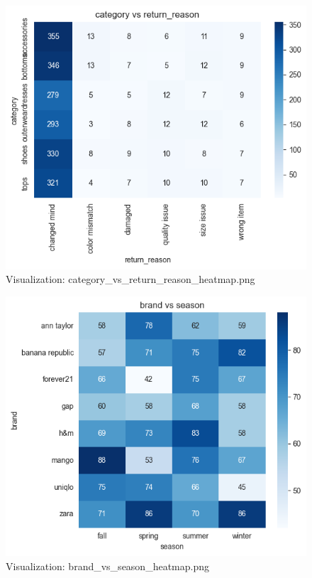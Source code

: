 \documentclass{article}%
\begin{document}
\vspace{10pt}%
\\%
\begin{minipage}[c]{0.48\textwidth}%


\begin{figure}[H]%
\centering%
\includegraphics[width=\linewidth]{output/plots/category_vs_return_reason_heatmap.png}%
\caption{Visualization: category\_vs\_return\_reason\_heatmap.png}%
\end{figure}

%
\end{minipage}%
\begin{minipage}[c]{0.48\textwidth}%


\begin{figure}[H]%
\centering%
\includegraphics[width=\linewidth]{output/plots/brand_vs_season_heatmap.png}%
\caption{Visualization: brand\_vs\_season\_heatmap.png}%
\end{figure}

%
\end{minipage}%
\end{document}
